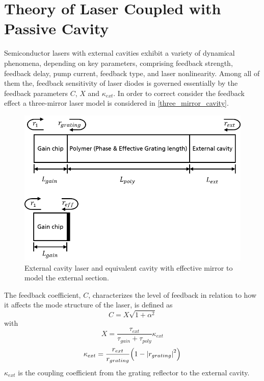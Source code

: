 \chapter{Theory of Laser Coupled with Passive Cavity}
\label{ch:theory}
Semiconductor lasers with external cavities exhibit a variety of dynamical phenomena, depending on key parameters, comprising feedback strength, feedback delay, pump current, feedback type, and laser nonlinearity\cite{}. Among all of them the, feedback sensitivity of laser diodes is governed essentially by the feedback parameters $C$, $X$ and $\kappa_{ext}$. In order to correct consider the feedback effect a three-mirror laser model is considered in \autoref{three_mirror_cavity}. 
\begin{figure}[ht]
    \centering
    \includegraphics[width=12cm]{figures/laser_cavity_model.png}
    \caption{External cavity laser and equivalent cavity with effective mirror to model the external section.}
    \label{three_mirror_cavity}
\end{figure}

The feedback coefficient, $C$, characterizes the level of feedback in relation to how it affects the mode structure of the laser, is defined as
\begin{equation}
    C=X\sqrt{1+\alpha^2}
\end{equation}
with
\begin{equation}
    X=\frac{\tau_{ext}}{\tau_{gain}+\tau_{poly}}\kappa_{ext}
\end{equation}
\begin{equation}
    \kappa_{ext}=\frac{r_{ext}}{r_{grating}}\qty(1-\abs{r_{grating}}^2)
\end{equation}
$\kappa_{ext}$ is the coupling coefficient from the grating reflector to the external cavity.

